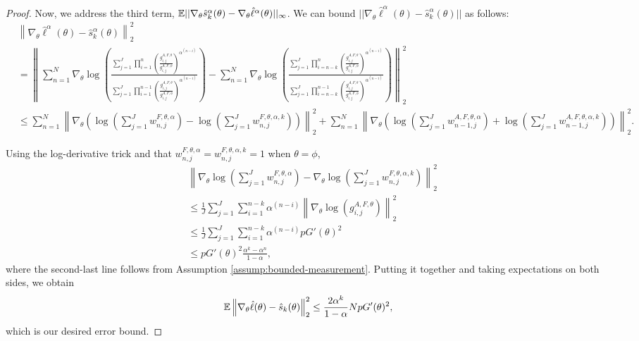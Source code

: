 \documentclass{article}
\begin{document}
\begin{proof}
Now, we address the third term, $\mathbb{E}||\nabla_\theta\hat s_k^\alpha(\theta) -  \nabla_\theta\hat\ell^\alpha(\theta)||_\infty$. We can bound $||\nabla_\theta\hat\ell^\alpha(\theta) - \hat s_k^\alpha(\theta)||$ as follows:
\begin{align*}
    &\left\lVert\nabla_\theta\hat\ell^\alpha(\theta) - \hat s_k^\alpha(\theta) \right\rVert_2^2\\
    &= \left\lVert\sum_{n=1}^N \nabla_\theta \log\left(\frac{\sum_{j=1}^J\prod_{i=1}^n\left(\frac{g_{i,j}^{A,F,\theta}}{g_{i,j}^{A,F,\phi}} \right)^{\alpha^{(n-i)}}}{\sum_{j=1}^J\prod_{i=1}^{n-1}\left(\frac{g_{i,j}^{A,F,\theta}}{g_{i,j}^{A,F,\phi}} \right)^{\alpha^{(n-i)}}}\right) - \sum_{n=1}^N \nabla_\theta\log\left(\frac{\sum_{j=1}^J\prod_{i=n-k}^n\left(\frac{g_{i,j}^{A,F,\theta}}{g_{i,j}^{A,F,\phi}} \right)^{\alpha^{(n-i)}}}{\sum_{j=1}^J\prod_{i=n-k}^{n-1}\left(\frac{g_{i,j}^{A,F,\theta}}{g_{i,j}^{A,F,\phi}} \right)^{\alpha^{(n-i)}}}\right) \right\rVert_2^2\\
    &\leq \sum_{n=1}^N \left\lVert\nabla_\theta \left(\log\left(\sum_{j=1}^Jw_{n,j}^{F,\theta,\alpha}\right)- \log\left(\sum_{j=1}^Jw_{n,j}^{F,\theta,\alpha,k}\right)\right)\right\lVert_2^2
    +\sum_{n=1}^N \left\lVert\nabla_\theta \left(\log\left(\sum_{j=1}^Jw_{n-1,j}^{A, F,\theta, \alpha}\right) + \log\left(\sum_{j=1}^Jw_{n-1,j}^{A, F,\theta,\alpha, k}\right)\right)\right\rVert_2^2.
\end{align*}

Using the log-derivative trick and that $w_{n,j}^{F,\theta,\alpha} = w_{n,j}^{F,\theta,\alpha,k} = 1$ when $\theta=\phi$,
\begin{align*}
    &\left\lVert\nabla_\theta\log\left(\sum_{j=1}^J w_{n,j}^{F,\theta,\alpha}\right)-\nabla_\theta\log\left(\sum_{j=1}^J w_{n,j}^{F,\theta,\alpha,k}\right)\right\rVert_2^2\\
    &\leq \frac{1}{J}\sum_{j=1}^J \sum_{i=1}^{n-k}\alpha^{(n-i)}\left\lVert\nabla_\theta\log\left(g_{i,j}^{A,F,\theta} \right)\right\rVert_2^2\\
    &\leq \frac{1}{J}\sum_{j=1}^J \sum_{i=1}^{n-k}\alpha^{(n-i)}pG'(\theta)^2\\
    &\leq pG'(\theta)^2\frac{\alpha^k-\alpha^n}{1-\alpha},
\end{align*}
where the second-last line follows from Assumption \ref{assump:bounded-measurement}. Putting it together and taking expectations on both sides, we obtain
$$\mathbb{E}\left\lVert\nabla_\theta\hat\ell(\theta) - \hat s_k(\theta) \right\rVert_2^2 \leq  \frac{2\alpha^k}{1-\alpha}NpG'(\theta)^2,$$
which is our desired error bound. 


\end{proof}
\end{document}
